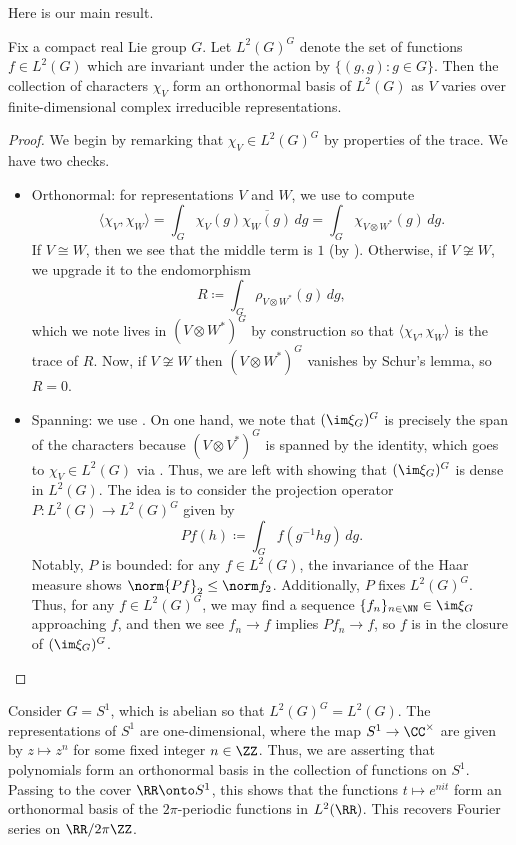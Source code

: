 \documentclass[notes.tex]{subfiles}
\begin{document}
Here is our main result.
\begin{theorem} \label{thm:char-ortho}
	Fix a compact real Lie group $G$. Let $L^2(G)^G$ denote the set of functions $f\in L^2(G)$ which are invariant under the action by $\{(g,g):g\in G\}$. Then the collection of characters $\chi_V$ form an orthonormal basis of $L^2(G)$ as $V$ varies over finite-dimensional complex irreducible representations.
\end{theorem}
\begin{proof}
	We begin by remarking that $\chi_V\in L^2(G)^G$ by properties of the trace. We have two checks.
	\begin{itemize}
		\item Orthonormal: for representations $V$ and $W$, we use  to compute
		\[\langle\chi_V,\chi_W\rangle=\int_G\chi_V(g)\overline{\chi_W(g)}\,dg=\int_G\chi_{V\otimes W^*}(g)\,dg.\]
		If $V\cong W$, then we see that the middle term is $1$ (by ). Otherwise, if $V\not\cong W$, we upgrade it to the endomorphism
		\[R\coloneqq\int_G\rho_{V\otimes W^*}(g)\,dg,\]
		which we note lives in $(V\otimes W^*)^G$ by construction so that $\langle\chi_V,\chi_W\rangle$ is the trace of $R$. Now, if $V\not\cong W$ then $(V\otimes W^*)^G$ vanishes by Schur's lemma, so $R=0$.
		\item Spanning: we use . On one hand, we note that $(\im\xi_G)^G$ is precisely the span of the characters because $(V\otimes V^*)^G$ is spanned by the identity, which goes to $\chi_V\in L^2(G)$ via . Thus, we are left with showing that $(\im\xi_G)^G$ is dense in $L^2(G)$. The idea is to consider the projection operator $P\colon L^2(G)\to L^2(G)^G$ given by
		\[Pf(h)\coloneqq\int_Gf\left(g^{-1}hg\right)\,dg.\]
		Notably, $P$ is bounded: for any $f\in L^2(G)$, the invariance of the Haar measure shows $\norm{Pf}_2\le\norm f_2$. Additionally, $P$ fixes $L^2(G)^G$. Thus, for any $f\in L^2(G)^G$, we may find a sequence $\{f_n\}_{n\in\NN}\in\im\xi_G$ approaching $f$, and then we see $f_n\to f$ implies $Pf_n\to f$, so $f$ is in the closure of $(\im\xi_G)^G$.
		\qedhere
	\end{itemize}
\end{proof}
\begin{example}
	Consider $G=S^1$, which is abelian so that $L^2(G)^G=L^2(G)$. The representations of $S^1$ are one-dimensional, where the map $S^1\to\CC^\times$ are given by $z\mapsto z^n$ for some fixed integer $n\in\ZZ$. Thus, we are asserting that polynomials form an orthonormal basis in the collection of functions on $S^1$. Passing to the cover $\RR\onto S^1$, this shows that the functions $t\mapsto e^{nit}$ form an orthonormal basis of the $2\pi$-periodic functions in $L^2(\RR)$. This recovers Fourier series on $\RR/2\pi\ZZ$.
\end{example}
\end{document}
